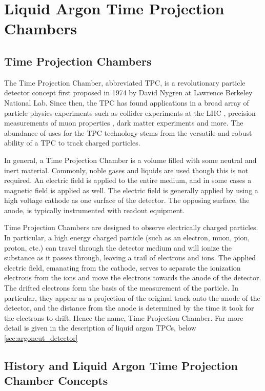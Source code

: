 \chapter{Liquid Argon Time Projection Chambers}

\section{Time Projection Chambers}

The Time Projection Chamber, abbreviated TPC, is a revolutionary particle detector concept first proposed in 1974 by David Nygren at Lawrence Berkeley National Lab.  Since then, the TPC has found applications in a broad array of particle physics experiments such as collider experiments at the LHC \cite{Lippmann:2104844,Aamodt:2008zz}, precision measurements of muon properties \cite{Luo:2015oca}, dark matter experiments \cite{Akerib:2012ys,Aprile:2011dd} and more.  The abundance of uses for the TPC technology stems from the versatile and robust ability of a TPC to track charged particles.

In general, a Time Projection Chamber is a volume filled with some neutral and inert material.  Commonly, noble gases and liquids are used though this is not required.  An electric field is applied to the entire medium, and in some cases a magnetic field is applied as well.  The electric field is generally applied by using a high voltage cathode as one surface of the detector.  The opposing surface, the anode, is typically instrumented with readout equipment.

Time Projection Chambers are designed to observe electrically charged particles.  In particular, a high energy charged particle (such as an electron, muon, pion, proton, etc.) can travel through the detector medium and will ionize the substance as it passes through, leaving a trail of electrons and ions.  The applied electric field, emanating from the cathode, serves to separate the ionization electrons from the ions and move the electrons towards the anode of the detector.  The drifted electrons form the basis of the measurement of the particle.  In particular, they appear as a projection of the original track onto the anode of the detector, and the distance from the anode is determined by the time it took for the electrons to drift.  Hence the name, Time Projection Chamber.  Far more detail is given in the description of liquid argon TPCs, below \ref{sec:argoneut_detector}

\section{History and Liquid Argon Time Projection Chamber Concepts}

